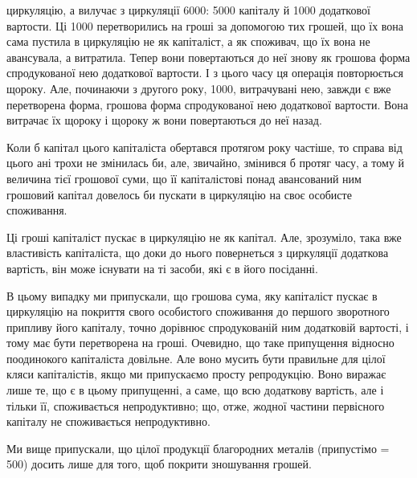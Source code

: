 \parcont{}  %
циркуляцію, а вилучає з циркуляції 6000: 5000 капіталу й
1000 додаткової вартости. Ці 1000 перетворились на
гроші за допомогою тих грошей, що їх вона сама пустила в циркуляцію
не як капіталіст, а як споживач, що їх вона не авансувала, а витратила.
Тепер вони повертаються до неї знову як грошова форма спродукованої
нею додаткової вартости. І з цього часу ця операція повторюється
щороку. Але, починаючи з другого року, 1000, витрачувані нею,
завжди є вже перетворена форма, грошова форма спродукованої нею
додаткової вартости. Вона витрачає їх щороку і щороку ж вони повертаються
до неї назад.

Коли б капітал цього капіталіста обертався протягом року частіше,
то справа від цього ані трохи не змінилась би, але, звичайно, змінився
б протяг часу, а тому й величина тієї грошової суми, що її капіталістові
понад авансований ним грошовий капітал довелось би пускати в
циркуляцію на своє особисте споживання.

Ці гроші капіталіст пускає в циркуляцію не як капітал. Але, зрозуміло,
така вже властивість капіталіста, що доки до нього повернеться з
циркуляції додаткова вартість, він може існувати на ті засоби, які є в
його посіданні.

В цьому випадку ми припускали, що грошова сума, яку капіталіст
пускає в циркуляцію на покриття свого особистого споживання до першого
зворотного припливу його капіталу, точно дорівнює спродукованій ним
додатковій вартості, і тому має бути перетворена на гроші. Очевидно,
що таке припущення відносно поодинокого капіталіста довільне. Але
воно мусить бути правильне для цілої кляси капіталістів, якщо ми
припускаємо просту репродукцію. Воно виражає лише те, що є в цьому
припущенні, а саме, що всю додаткову вартість, але і тільки її, споживається
непродуктивно; що, отже, жодної частини первісного капіталу
не споживається непродуктивно.

Ми вище припускали, що цілої продукції благородних металів
(припустімо = 500) досить лише для того, щоб покрити зношування
грошей.


